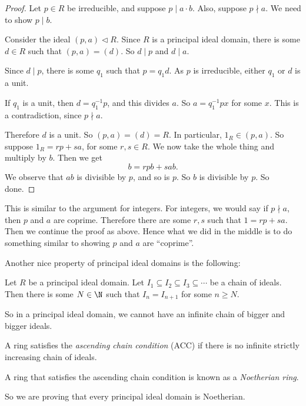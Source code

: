 \documentclass[a4paper]{article}
\begin{document}
\begin{proof}
  Let $p \in R$ be irreducible, and suppose $p \mid a\cdot b$. Also, suppose $p \nmid a$. We need to show $p \mid b$.

  Consider the ideal $(p, a) \lhd R$. Since $R$ is a principal ideal domain, there is some $d \in R$ such that $(p, a) = (d)$. So $d \mid p$ and $d \mid a$.

  Since $d \mid p$, there is some $q_1$ such that $p = q_1 d$. As $p$ is irreducible, either $q_1$ or $d$ is a unit.

  If $q_1$ is a unit, then $d = q_1^{-1} p$, and this divides $a$. So $a = q_1^{-1} p x$ for some $x$. This is a contradiction, since $p\nmid a$.

  Therefore $d$ is a unit. So $(p, a) = (d) = R$. In particular, $1_R \in (p, a)$. So suppose $1_R = rp + sa$, for some $r, s \in R$. We now take the whole thing and multiply by $b$. Then we get
  \[
    b = rpb + sab.
  \]
  We observe that $ab$ is divisible by $p$, and so is $p$. So $b$ is divisible by $p$. So done.
\end{proof}
This is similar to the argument for integers. For integers, we would say if $p \nmid a$, then $p$ and $a$ are coprime. Therefore there are some $r, s$ such that $1 = rp + sa$. Then we continue the proof as above. Hence what we did in the middle is to do something similar to showing $p$ and $a$ are ``coprime''.

Another nice property of principal ideal domains is the following:
\begin{lemma}
  Let $R$ be a principal ideal domain. Let $I_1 \subseteq I_2 \subseteq I_3 \subseteq \cdots$ be a chain of ideals. Then there is some $N\in \N$ such that $I_n = I_{n + 1}$ for some $n \geq N$.
\end{lemma}
So in a principal ideal domain, we cannot have an infinite chain of bigger and bigger ideals.

\begin{defi}
  A ring satisfies the \emph{ascending chain condition} (ACC) if there is no infinite strictly increasing chain of ideals.
\end{defi}

\begin{defi}
  A ring that satisfies the ascending chain condition is known as a \emph{Noetherian ring}.
\end{defi}

So we are proving that every principal ideal domain is Noetherian.
\end{document}
